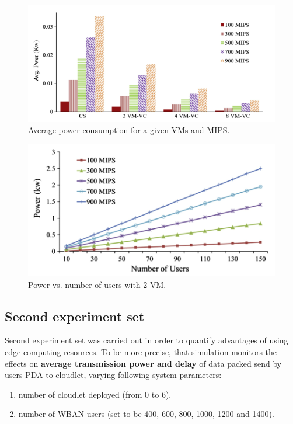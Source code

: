 \documentclass[sigchi]{acmart}
\begin{document}
\begin{figure}
  \includegraphics[width=\linewidth]{Set1.1.png}
  \caption{Average power consumption for a given VMs and MIPS.}
  \label{fig:model}
\end{figure}

\begin{figure}
  \includegraphics[width=\linewidth]{Set1.2.png}
  \caption{Power vs. number of users with 2 VM.}
  \label{fig:model}
\end{figure}

\subsection{Second experiment set}

Second experiment set was carried out in order to quantify advantages of using edge computing resources. To be more precise, that simulation monitors the effects on \textbf{average transmission power and delay} of data packed send by users PDA to cloudlet, varying following system parameters:

\begin{enumerate}
\item number of cloudlet deployed (from 0 to 6).
\item number of WBAN users (set to be 400, 600, 800, 1000, 1200 and 1400).
\end{enumerate}
\end{document}
